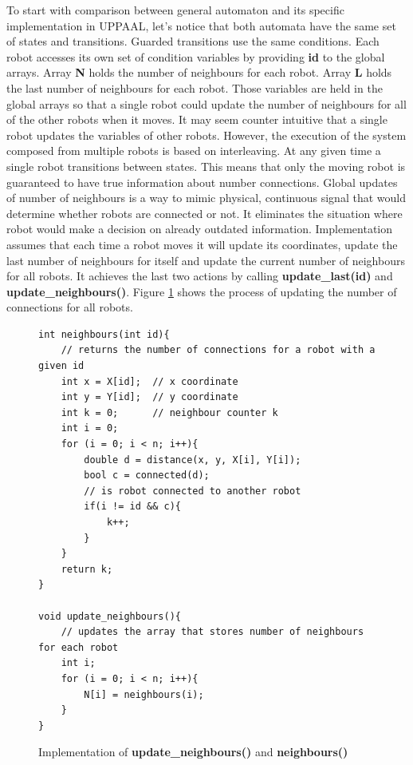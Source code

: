 To start with comparison between general automaton and its specific implementation in UPPAAL, let's notice that both automata have the same set of states and transitions. Guarded transitions use the same conditions. Each robot accesses its own set of condition variables by providing \textbf{id} to the global arrays. Array \textbf{N} holds the number of neighbours for each robot. Array \textbf{L} holds the last number of neighbours for each robot. Those variables are held in the global arrays so that a single robot could update the number of neighbours for all of the other robots when it moves. It may seem counter intuitive that a single robot updates the variables of other robots. However, the execution of the system composed from multiple robots is based on interleaving. At any given time a single robot transitions between states. This means that only the moving robot is guaranteed to have true information about number connections. Global updates of number of neighbours is a way to mimic physical, continuous signal that would determine whether robots are connected or not. It eliminates the situation where robot would make a decision on already outdated information. Implementation assumes that each time a robot moves it will update its coordinates, update the last number of neighbours for itself and update the current number of neighbours for all robots. It achieves the last two actions by calling \textbf{update\_last(id)} and \textbf{update\_neighbours()}. Figure \ref{fig:neighbours} shows the process of updating the number of connections for all robots.
\begin{figure}[H]
\caption{Implementation of \textbf{update\_neighbours()} and \textbf{neighbours()}}
\lstset { language=C++ }
\begin{lstlisting}
int neighbours(int id){
    // returns the number of connections for a robot with a given id
    int x = X[id];  // x coordinate
    int y = Y[id];  // y coordinate
    int k = 0;      // neighbour counter k
    int i = 0;   
    for (i = 0; i < n; i++){
        double d = distance(x, y, X[i], Y[i]);
        bool c = connected(d);
        // is robot connected to another robot
        if(i != id && c){
            k++;
        }
    }
    return k;
}

void update_neighbours(){
    // updates the array that stores number of neighbours for each robot
    int i;
    for (i = 0; i < n; i++){
        N[i] = neighbours(i);
    }
}
\end{lstlisting}
\label{fig:neighbours}
\end{figure}